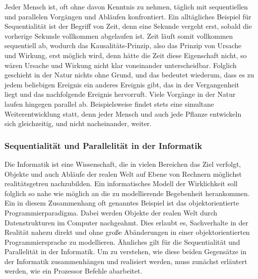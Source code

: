				Jeder Mensch ist, oft ohne davon Kenntnis zu nehmen, täglich mit sequentiellen und parallelen Vorgängen und Abläufen konfrontiert. Ein alltägliches Beispiel für Sequentialität ist der Begriff von Zeit, denn eine Sekunde vergeht erst, sobald die vorherige Sekunde vollkommen abgelaufen ist. Zeit läuft somit vollkommen sequentiell ab, wodurch das Kausalitäts-Prinzip, also das Prinzip von Ursache und Wirkung, erst möglich wird, denn hätte die Zeit diese Eigenschaft nicht, so wären Ursache und Wirkung nicht klar voneinander unterscheidbar. Folglich geschieht in der Natur nichts ohne Grund, und das bedeutet wiederum, dass es zu jedem beliebigen Ereignis ein anderes Ereignis gibt, das in der Vergangenheit liegt und das nachfolgende Ereignis hervorruft. \cite{Kausalitaet} Viele Vorgänge in der Natur laufen hingegen parallel ab. Beispielsweise findet stets eine simultane Weiterentwicklung statt, denn jeder Mensch und auch jede Pflanze entwickeln sich gleichzeitig, und nicht nacheinander, weiter. \cite{ParaProgLoogen}
				
			\subsubsection{Sequentialität und Parallelität in der Informatik}
				\label{SequUndParaInformatik}
				
				Die Informatik ist eine Wissenschaft, die in vielen Bereichen das Ziel verfolgt, Objekte und auch Abläufe der realen Welt auf Ebene von Rechnern möglichst realitätsgetreu nachzubilden. Ein informatisches Modell der Wirklichkeit soll folglich so nahe wie möglich an die zu modellierende Begebenheit herankommen. Ein in diesem Zusammenhang oft genanntes Beispiel ist das objektorientierte Programmierparadigma. Dabei werden Objekte der realen Welt durch Datenstrukturen im Computer nachgeahmt. Dies erlaubt es, Sachverhalte in der Realität nahezu direkt und ohne große Abänderungen in einer objektorientierten Programmiersprache zu modellieren. \cite{Objektorientierung} Ähnliches gilt für die Sequentialität und Parallelität in der Informatik. Um zu verstehen, wie diese beiden Gegensätze in der Informatik zusammenhängen und realisiert werden, muss zunächst erläutert werden, wie ein Prozessor Befehle abarbeitet.
				
